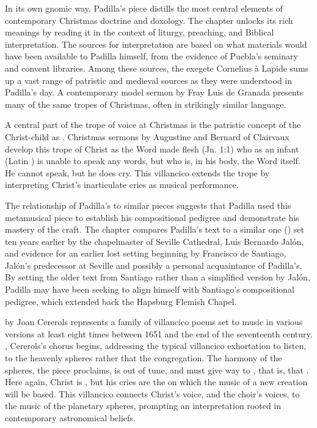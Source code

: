 \documentclass{vcbook-proposal}
\begin{document}
In its own gnomic way, Padilla's piece distills the most central elements of 
contemporary Christmas doctrine and doxology.
The chapter unlocks its rich meanings by reading it in the context of liturgy, 
preaching, and Biblical interpretation.
The sources for interpretation are based on what materials would have been 
available to Padilla himself, from the evidence of Puebla's seminary and 
convent libraries.
Among these sources, the exegete Cornelius à Lapide sums up a vast range of 
patristic and medieval sources as they were understood in Padilla's day. 
A contemporary model sermon by Fray Luis de Granada presents many of the same 
tropes of Christmas, often in strikingly similar language.

A central part of the trope of voice at Christmas is the patristic concept of 
the Christ-child as . 
Christmas sermons by Augustine and Bernard of Clairvaux develop this trope of 
Christ as the Word made flesh (Jn. 1:1) who as an infant (Latin 
) is unable to speak any words, but who is, in his body, the 
Word itself.
He cannot speak, but he does cry.
This villancico extends the trope by interpreting Christ's inarticulate cries 
as musical performance.

The relationship of Padilla's  to similar 
pieces suggests that Padilla used this metamusical piece to establish his 
compositional pedigree and demonstrate his mastery of the craft.
The chapter compares Padilla's text to a similar one () set ten years earlier by the chapelmaster of Seville Cathedral, Luis 
Bernardo Jalón, and evidence for an earlier lost setting beginning 
 by Francisco de Santiago, Jalón's 
predecessor at Seville and possibly a personal acquaintance of Padilla's.
By setting the older text from Santiago rather than a simplified version by 
Jalón, Padilla may have been seeking to align himself with Santiago's 
compositional pedigree, which extended back the Hapsburg Flemish Chapel.



 by Joan Cererols represents a family of 
villancico poems set to music in various versions at least eight times between 
1651 and the end of the seventeenth century.
, Cererols's chorus begins, 
addressing the typical villancico exhortation to listen, to the heavenly 
spheres rather that the congregation. 
The harmony of the spheres, the piece proclaims, is out of tune, and must give 
way to , that is,  that .
Here again, Christ is , but his cries are the  on which the music of a new creation will be based.
This villancico connects Christ's voice, and the choir's voices, to the music 
of the planetary spheres, prompting an interpretation rooted in contemporary 
astronomical beliefs.
\end{document}

